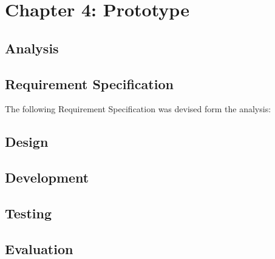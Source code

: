 \section{Chapter 4: Prototype}
	\subsection{Analysis}
	\subsection{Requirement Specification}
	The following Requirement Specification was devised form the analysis:
	
	\subsection{Design}
	\subsection{Development}
	\subsection{Testing}
	\subsection{Evaluation}

	